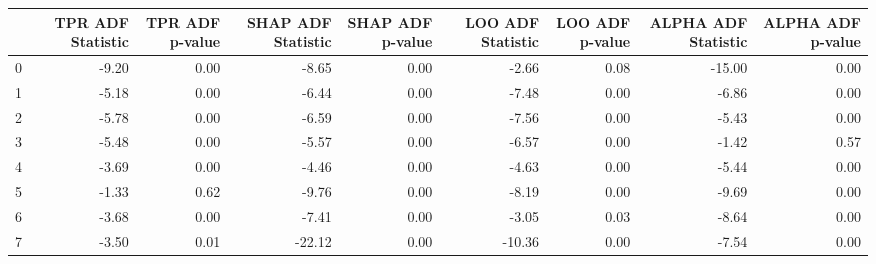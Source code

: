 \begin{tabular}{lrrrrrrrr}
\toprule
 & TPR ADF Statistic & TPR ADF p-value & SHAP ADF Statistic & SHAP ADF p-value & LOO ADF Statistic & LOO ADF p-value & ALPHA ADF Statistic & ALPHA ADF p-value \\
\midrule
0 & -9.20 & 0.00 & -8.65 & 0.00 & -2.66 & 0.08 & -15.00 & 0.00 \\
1 & -5.18 & 0.00 & -6.44 & 0.00 & -7.48 & 0.00 & -6.86 & 0.00 \\
2 & -5.78 & 0.00 & -6.59 & 0.00 & -7.56 & 0.00 & -5.43 & 0.00 \\
3 & -5.48 & 0.00 & -5.57 & 0.00 & -6.57 & 0.00 & -1.42 & 0.57 \\
4 & -3.69 & 0.00 & -4.46 & 0.00 & -4.63 & 0.00 & -5.44 & 0.00 \\
5 & -1.33 & 0.62 & -9.76 & 0.00 & -8.19 & 0.00 & -9.69 & 0.00 \\
6 & -3.68 & 0.00 & -7.41 & 0.00 & -3.05 & 0.03 & -8.64 & 0.00 \\
7 & -3.50 & 0.01 & -22.12 & 0.00 & -10.36 & 0.00 & -7.54 & 0.00 \\
\bottomrule
\end{tabular}
